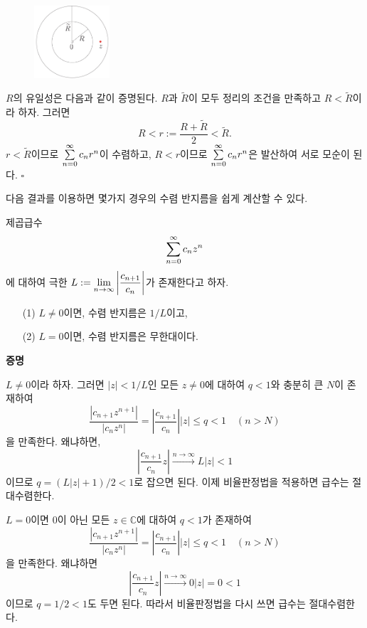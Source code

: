 \begin{figure}[h!]
\begin{center}
\includegraphics[width=0.25\textwidth]{./SaltChapter/figs/fig-4-0-2}
\end{center}
\end{figure}

$R$의 유일성은 다음과 같이 증명된다.
$R$과 $\tilde R$이 모두 정리의 조건을 만족하고 $R<\tilde R$이라 하자.
그러면
\[
R < r:= \dfrac{R+\tilde R}{2} < \tilde R.
\]
$r<\tilde R$이므로
$\sum\limits_{n=0}^\infty c_n r^n$이 수렴하고,
$R<r$이므로 $\sum\limits_{n=0}^\infty c_n r^n$은 발산하여
서로 모순이 된다.
\hfill $\square$

다음 결과를 이용하면
몇가지 경우의 수렴 반지름을 쉽게 계산할 수 있다.

 \begin{salttheorem} {}{} \label{thm-4-2}
제곱급수 
\[
\sum\limits_{n=0}^\infty c_nz^n
\]에 대하여 극한
$L:= \lim\limits_{n\to\infty} \left| \displaystyle\frac{c_{n+1}}{c_n}\right|$가
존재한다고 하자. 
\begin{itemize}
\item[(1)] $L\ne0$이면, 수렴 반지름은 $1/L$이고,
\item[(2)] $L=0$이면, 수렴 반지름은 무한대이다.
\end{itemize}
\end{salttheorem}

{\bf 증명}

$L\ne0$이라 하자.
그러면 $|z|<1/L$인 모든 $z\ne0$에 대하여
$q<1$와 충분히 큰 $N$이 존재하여
\[
\dfrac{|c_{n+1}z^{n+1}|}{|c_nz^n|}
= \left| \dfrac{c_{n+1}}{c_n}\right| |z| \le q <1
\quad (n>N)
\]
을 만족한다.
왜냐하면,
\[
\left|\dfrac{c_{n+1}}{c_n}z\right|
\xrightarrow{n\to\infty}
L|z|<1
\]
이므로 $q=(L|z|+1)/2 <1$로 잡으면 된다.
이제 비율판정법을 적용하면 급수는 절대수렴한다.

$L=0$이면 $0$이 아닌 모든 $z\in \mathbb C$에 대하여
$q<1$가 존재하여
\[
\dfrac{|c_{n+1}z^{n+1}|}{|c_nz^n|}
= \left| \dfrac{c_{n+1}}{c_n}\right| |z| \le q <1
\quad (n>N)
\]
을 만족한다. 왜냐하면
\[
\left|\dfrac{c_{n+1}}{c_n}z\right|
\xrightarrow{n\to\infty}
0|z|=0<1
\]
이므로 $q=1/2<1$도 두면 된다.
따라서 비율판정법을 다시 쓰면 급수는 절대수렴한다.

